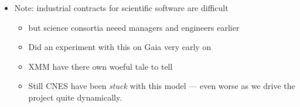{\begin{itemize}
\begin{itemize}
    \end{itemize}
  \item Note: industrial contracts for scientific software are difficult
    \begin{itemize}
	\item but science consortia neeed managers and engineers earlier 
      \item Did an experiment with this on Gaia very early on
      \item XMM have there own woeful tale to tell
      \item Still CNES have been {\em stuck}  with this model --- even worse as we drive the project
        quite dynamically.
    \end{itemize}
\end{itemize}
}



